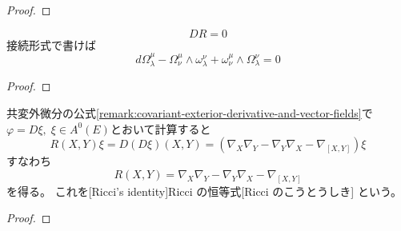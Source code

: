 \documentclass[report]{jlreq}
\begin{document}
\begin{proof}
    \TODO{}
\end{proof}

\begin{proposition}
    \begin{equation}
        DR = 0
    \end{equation}
    接続形式で書けば
    \begin{equation}
        d\Omega^\mu_\lambda
            - \Omega^\mu_\nu \wedge \omega^\nu_\lambda
            + \omega^\mu_\nu \wedge \Omega^\nu_\lambda
            = 0
    \end{equation}
    \TODO{}
\end{proposition}

\begin{proof}
    \TODO{}
\end{proof}

\begin{proposition}
    共変外微分の公式\cref{remark:covariant-exterior-derivative-and-vector-fields}で
    $\varphi = D\xi, \; \xi \in A^0(E)$とおいて計算すると
    \begin{equation}
        R(X, Y) \xi
            = D(D\xi)(X, Y)
            = (\nabla_X \nabla_Y - \nabla_Y \nabla_X - \nabla_{[X, Y]}) \xi
    \end{equation}
    すなわち
    \begin{equation}
        R(X, Y) = \nabla_X \nabla_Y - \nabla_Y \nabla_X - \nabla_{[X, Y]}
    \end{equation}
    を得る。
    これを[Ricci's identity]{Ricci の恒等式}[Ricci のこうとうしき]
    という。
\end{proposition}

\begin{proof}
    \TODO{}
\end{proof}

\begin{definition}[直和束の曲率]
    \TODO{}
\end{definition}

\begin{definition}[テンソル積束の曲率]
    \TODO{}
\end{definition}

\begin{definition}[双対束の曲率]
    \TODO{}
\end{definition}

\begin{definition}[引き戻し束の曲率]
    \TODO{}
\end{definition}
\end{document}
